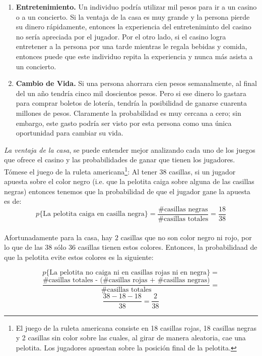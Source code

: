 \begin{enumerate}
	\item \textbf{Entretenimiento.} Un individuo podría utilizar mil pesos para ir a un casino o a un concierto. Si la ventaja de la casa es muy grande y la persona pierde su dinero rápidamente, entonces la experiencia del entreteniminto del casino no sería apreciada por el jugador. Por el otro lado, si el casino logra entretener a la persona por una tarde mientras le regala bebidas y comida, entonces puede que este individuo repita la experiencia y nunca más asista a un concierto.
	\item \textbf{Cambio de Vida.} Si una persona ahorrara cien pesos semanalmente, al final del un año tendría cinco mil doscientos pesos. Pero si ese dinero lo gastara para comprar boletos de lotería, tendría la posibilidad de ganarse cuarenta millones de pesos. Claramente la probabilidad es muy cercana a cero; sin embargo, este gasto podría ser visto por esta persona como una única oportunidad para cambiar su vida.

\end{enumerate}

\emph{La ventaja de la casa}, se puede entender mejor analizando cada uno de los juegos que ofrece el casino y las probabilidades de ganar que tienen los jugadores. Tómese el juego de la ruleta americana\footnote{El juego de la ruleta americana consiste en 18 casillas rojas, 18 casillas negras y 2 casillas sin color sobre las cuales, al girar de manera aleatoria, cae una pelotita. Los jugadores apuestan sobre la posición final de la pelotita.}:
Al tener $38$ casillas, si un jugador apuesta sobre el color negro (i.e. que la pelotita caiga sobre alguna de las casillas negras) entonces tenemos que la probabilidad de que el jugador gane la apuesta es de:\\
\[p\{\text{La pelotita caiga en casilla negra}\} = \frac{\text{\# casillas negras}}{ \text{\# casillas totales}}  = \frac{18}{38}\]\\

Afortunadamente para la casa, hay $2$ casillas que no son color negro ni rojo, por lo que de las $38$ sólo $36$ casillas tienen estos colores. Entonces, la probabilidaad de que la pelotita evite estos colores es la siguiente:

\[p\{\text{La pelotita no caiga ni en casillas rojas ni en negra}\} =\] 
\[\frac{\text{\# casillas totales - (\# casillas rojas + \# casillas negras)}}{ \text{\# casillas totales}}  =\]
\[\frac{38-18-18}{38} = \frac{2}{38}  \]

